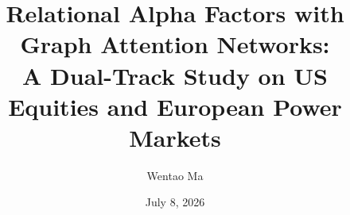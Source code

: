 \documentclass[11pt,a4paper,oneside,numbers=noenddot,bibliography=totoc]{scrreprt}
\title{Relational Alpha Factors with Graph Attention Networks:\\
A Dual-Track Study on US Equities and European Power Markets}
\author{Wentao Ma}
\date{July 8, 2026}
\newif\ifchapflow \chapflowfalse
\begin{document}




\tableofcontents
\clearpage
\chapflowtrue










\chapflowfalse
\printbibliography

\appendix

\end{document}
